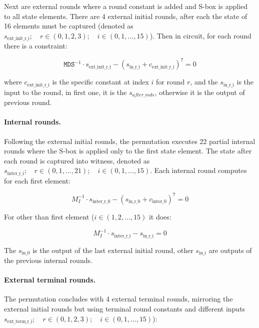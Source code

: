Next are external rounds where a round constant is added and S-box
is applied to all state elements. There are 4 external initial rounds, after each
the state of 16 elements must be captured (denoted as
$s_{\text{ext\_init\_r\_i}}; \quad r \in (0, 1, 2, 3); \quad i \in (0, 1, \ldots, 15)$).
Then in circuit, for each round there is a constraint:

\begin{equation}
	\texttt{MDS}^{-1} \cdot s_{\text{ext\_init\_r\_i}} - (s_{\text{in\_r\_i}} + c_{\text{ext\_init\_r\_i}})^7 = 0
\end{equation}

where $c_{\text{ext\_init\_r\_i}}$ is the specific constant at index $i$ for round
$r$, and the $s_{\text{in\_r\_i}}$ is the input to the round, in first one, it
is the $s_{after\_mds}$, otherwise it is the output of previous round.

\paragraph{Internal rounds.}

Following the external initial rounds, the permutation executes 22 partial
internal rounds where the S-box is applied only to the first state element.
The state after each round is captured into witness, denoted as $s_{\text{inter\_r\_i}}; \quad r \in (0, 1, \ldots, 21); \quad i \in (0, 1, \ldots, 15)$.
Each internal round computes for each first element:

\begin{equation}
	M_I^{-1} \cdot s_{\text{inter\_r\_0}} - (s_{\text{in\_r\_0}} + c_{\text{inter\_0}})^7 = 0
\end{equation}

For other than first element ($i \in (1, 2, \ldots, 15)$ it does:

\begin{equation}
	M_I^{-1} \cdot s_{\text{inter\_r\_i}} - s_{\text{in\_r\_i}} = 0
\end{equation}

The $s_{\text{in\_0}}$ is the output of the last external initial round, other
$s_{\text{in\_i}}$ are outputs of the previous internal rounds.

\paragraph{External terminal rounds.}

The permutation concludes with 4 external terminal rounds, mirroring the
external initial rounds but using terminal round constants and different inputs
$s_{\text{ext\_term\_r\_i}}; \quad r \in (0, 1, 2, 3); \quad i \in (0, 1, \ldots, 15)$):

